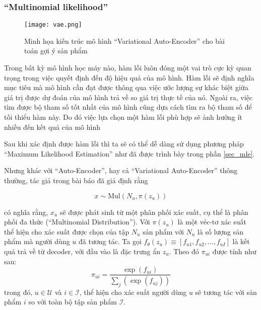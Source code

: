     \subsubsection{``Multinomial likelihood''}
    \label{mulll}
    \begin{figure}
        \centering
        \texttt{[image: vae.png]}
        \caption{Minh họa kiến trúc mô hình ``Variational Auto-Encoder'' cho bài toán gợi ý sản phẩm}
        \label{fig_mvae}
    \end{figure}
    Trong bất kỳ mô hình học máy nào, hàm lỗi luôn đóng một vai trò cực kỳ quan trọng trong việc quyết định đến độ hiệu quả của mô hình. 
    Hàm lỗi sẽ định nghĩa mục tiêu mà mô hình cần đạt được thông qua việc ước lượng sự khác biệt giữa giá trị được dự đoán của mô hình trả về so giá trị thực tế của nó.
    Ngoài ra, việc tìm được bộ tham số tốt nhất của mô hình cũng dựa cách tìm ra bộ tham số để tối thiểu hàm này.
    Do đó việc lựa chọn một hàm lỗi phù hợp sẽ ảnh hưởng ít nhiều đến kết quả của mô hình 

    Sau khi xác định được hàm lỗi thì ta sẽ có thể dễ dàng sử dụng phương pháp ``Maximum Likelihood Estimation'' như đã được trình bày trong phần \ref{sec_mle}.



    Nhưng khác với ``Auto-Encoder'', hay cả ``Variational Auto-Encoder'' thông thường, tác giả trong bài báo \cite{mvae} đã giả định rằng 

    \begin{equation}
        \label{asumpt_xu}
        x \sim \text{Mul}(N_u,\pi({z_u}))
    \end{equation}

    có nghĩa rằng, $x_u$ sẽ được phát sinh từ một phân phối xác suất, cụ thể là phân phối đa thức (``Multinomial Distribution'').
    Với $\pi(z_u)$ là một véc-tơ xác suất thể hiện cho xác suất được chọn của tập $N_u$ sản phẩm  với $N_u$ là số lượng sản phẩm mà người dùng $u$ đã tương tác.
    Ta gọi $f_\theta(z_u) \equiv [f_{u1}, f_{u2}, \dots , f_{uI}] $ 
    là kết quả trả về từ decoder, với đầu vào là đặc trưng ẩn $z_u$.
    Theo đó $\pi_{ui}$ được tính như sau:
    \begin{equation}
        \label{mult-ll}
        \pi_{ui} = \frac{\exp(f_{ui})}{\sum_j(\exp(f_{uj}))}
    \end{equation}
    trong đó, $u\in \mathcal{U}$ và $i \in \mathcal{I}$, thể hiện cho xác suất người dùng $u$ sẽ tương tác với sản phẩm $i$ so với toàn bộ tập sản phẩm  $\mathcal{I}$.
    
